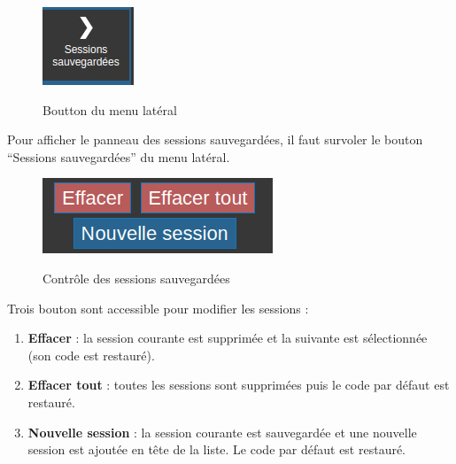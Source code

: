 \documentclass{tufte-handout}
\begin{document}
\begin{figure}[h!]
\raggedleft
\includegraphics[width=0.2\linewidth]{pics/session_button.png}
\label{f:session_button}
\caption{Boutton du menu latéral}
\end{figure}

Pour afficher le panneau des sessions sauvegardées, il faut survoler le bouton ``Sessions sauvegardées'' du menu latéral. 

\begin{figure}[h!]
\raggedleft
\includegraphics[width=0.4\linewidth]{pics/session_control.png}
\label{f:session_control}
\caption{Contrôle des sessions sauvegardées}
\end{figure}

Trois bouton sont accessible pour modifier les sessions : 
\begin{enumerate}     
\item \textbf{Effacer} : la session courante est supprimée et la suivante est sélectionnée (son code est restauré).
\item \textbf{Effacer tout} : toutes les sessions sont supprimées puis le code par défaut est restauré.
\item \textbf{Nouvelle session} : la session courante est sauvegardée et une nouvelle session est ajoutée en tête de la liste. Le code par défaut est restauré. 
\end{enumerate}
\end{document}
